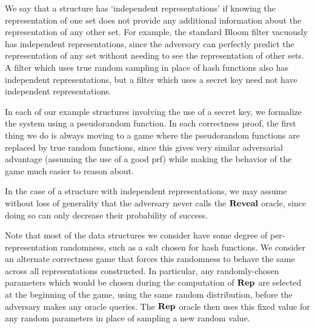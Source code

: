 We say that a structure has `independent representations' if knowing the representation of one set does not provide any additional information about the representation of any other set. For example, the standard Bloom filter vacuously has independent representations, since the adversary can perfectly predict the representation of any set without needing to see the representation of other sets. A filter which uses true random sampling in place of hash functions also has independent representations, but a filter which uses a secret key need not have independent representations.

In each of our example structures involving the use of a secret key, we formalize the system using a pseudorandom function. In each correctness proof, the first thing we do is always moving to a game where the pseudorandom functions are replaced by true random functions, since this gives very similar adversarial advantage (assuming the use of a good prf) while making the behavior of the game much easier to reason about.

In the case of a structure with independent representations, we may assume without loss of generality that the adversary never calls the $\mathbf{Reveal}$ oracle, since doing so can only decrease their probability of success.

Note that most of the data structures we consider have some degree of per-representation randomness, such as a salt chosen for hash functions. We consider an alternate correctness game that forces this randomness to behave the same across all representations constructed. In particular, any randomly-chosen parameters which would be chosen during the computation of $\mathbf{Rep}\hspace{0.5pt}$ are selected at the beginning of the game, using the same random distribution, before the adversary makes any oracle queries. The $\mathbf{Rep}\hspace{0.5pt}$ oracle then uses this fixed value for any random parameters in place of sampling a new random value.


